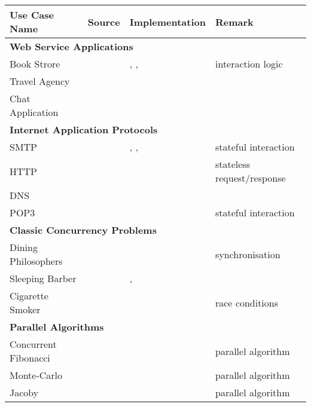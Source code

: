 \begin{table}[!h]
\begin{center}
\begin{tabular}{|l|l|l|l|}
	\hline
	Use Case Name & Source & Implementation & Remark
	\\

	\hline
	\hline
	\multicolumn{4}{|l|}{ \textbf{Web Service Applications}}
	\\
	\hline
	Book Strore & \cite{W3C} & \SJ, \Mungo, \JavaAPI  & interaction logic
	\\
	Travel Agency & \cite{W3C} & \SJ &
	\\
	Chat Application & \cite{SF15} & \Erlang &
	\\

	\hline
	\hline
	\multicolumn{4}{|l|}{ \textbf{Internet Application Protocols}}
	\\
	\hline
	SMTP & \cite{RFC} & \JavaAPI, \TypeState, \Links & stateful interaction
	\\
	HTTP & \cite{RFC} & \JavaAPI &	stateless request/response
	\\
	DNS & \cite{RFC,SF15} & \Erlang &
	\\
	POP3 & \cite{RFC} & \TypeState & stateful interaction
	\\

	\hline
	\hline
	\multicolumn{4}{|l|}{ \textbf{Classic Concurrency Problems}}
	\\
	\hline
	Dining Philosophers & \cite{Savina} & \SPython  & synchronisation
	\\
	Sleeping Barber & \cite{Savina} & \SPython, \SScala &
	\\
	Cigarette Smoker & \cite{Savina} & \SPython & race conditions
	\\
	
	\hline
	\hline
	\multicolumn{4}{|l|}{ \textbf{Parallel Algorithms}}
	\\
	\hline
	Concurrent Fibonacci &  & \Mungo & parallel algorithm
	\\
	Monte-Carlo & \cite{citation_needed} & \MPI & parallel algorithm
	\\
	Jacoby & \cite{citation_needed} & \MPI & parallel algorithm
	\\
		


\end{tabular}
\end{center}
\end{table}
